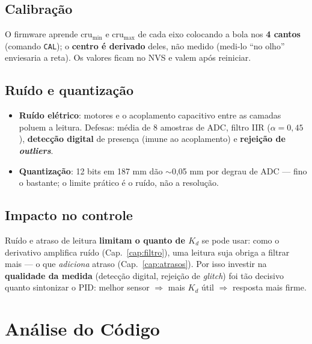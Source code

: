 \section{Calibra\c{c}\~ao}
O firmware aprende $\text{cru}_{\min}$ e $\text{cru}_{\max}$ de cada eixo colocando a
bola nos \textbf{4 cantos} (comando \texttt{CAL}); o \textbf{centro \'e derivado}
deles, n\~ao medido (medi-lo ``no olho'' enviesaria a reta). Os valores ficam no
NVS e valem ap\'os reiniciar.

\section{Ru\'ido e quantiza\c{c}\~ao}
\begin{itemize}[leftmargin=1.4em]
  \item \textbf{Ru\'ido el\'etrico}: motores e o acoplamento capacitivo entre as
  camadas poluem a leitura. Defesas: m\'edia de 8 amostras de ADC, filtro IIR
  ($\alpha=0{,}45$), \textbf{detec\c{c}\~ao digital} de presen\c{c}a (imune ao
  acoplamento) e \textbf{rejei\c{c}\~ao de \emph{outliers}}.
  \item \textbf{Quantiza\c{c}\~ao}: 12 bits em 187 mm d\~ao $\sim$0{,}05 mm por
  degrau de ADC --- fino o bastante; o limite pr\'atico \'e o ru\'ido, n\~ao a
  resolu\c{c}\~ao.
\end{itemize}

\section{Impacto no controle}
\begin{atencao}
Ru\'ido e atraso de leitura \textbf{limitam o quanto de $K_d$} se pode usar: como o
derivativo amplifica ru\'ido (Cap.~\ref{cap:filtro}), uma leitura suja obriga a
filtrar mais --- o que \emph{adiciona} atraso (Cap.~\ref{cap:atrasos}). Por isso
investir na \textbf{qualidade da medida} (detec\c{c}\~ao digital, rejei\c{c}\~ao de
\emph{glitch}) foi t\~ao decisivo quanto sintonizar o PID: melhor sensor
$\Rightarrow$ mais $K_d$ \'util $\Rightarrow$ resposta mais firme.
\end{atencao}

\chapter{An\'alise do C\'odigo}\label{cap:codigo}

